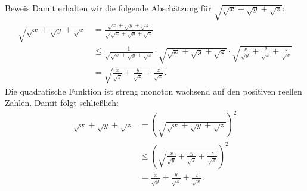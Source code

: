 \documentclass[10pt]{beamer}
\begin{document}
\begin{frame}{Beweis}
    Damit erhalten wir die folgende Abschätzung für \( \sqrt{\sqrt{x} + \sqrt{y} + \sqrt{z}} \):
    \begin{align*}
        \sqrt{\sqrt{x} + \sqrt{y} + \sqrt{z}}
        & = \frac{ \sqrt{x} + \sqrt{y} + \sqrt{z}}{\sqrt{\sqrt{x} + \sqrt{y} + \sqrt{z}}} \\
        & \leq \frac{1}{\sqrt{\sqrt{x} + \sqrt{y} + \sqrt{z}}} \cdot \sqrt{\sqrt{x} + \sqrt{y} + \sqrt{z}} \cdot \sqrt{\frac{x}{\sqrt{y}} + \frac{y}{\sqrt{z}} + \frac{z}{\sqrt{x}}} \\
        & = \sqrt{\frac{x}{\sqrt{y}} + \frac{y}{\sqrt{z}} + \frac{z}{\sqrt{x}}}.
    \end{align*}
    Die quadratische Funktion ist streng monoton wachsend auf den positiven reellen Zahlen. Damit folgt schließlich:
    {\small
    \begin{align*}
         \sqrt{x} + \sqrt{y} + \sqrt{z}
        & = \left( \sqrt{\sqrt{x} + \sqrt{y} + \sqrt{z}} \right)^{2} \\
        & \leq \left( \sqrt{\frac{x}{\sqrt{y}} + \frac{y}{\sqrt{z}} + \frac{z}{\sqrt{x}}} \right)^{2} \\
        & = \frac{x}{\sqrt{y}} + \frac{y}{\sqrt{z}} + \frac{z}{\sqrt{x}}.
    \end{align*}
    }
\end{frame}
\end{document}
